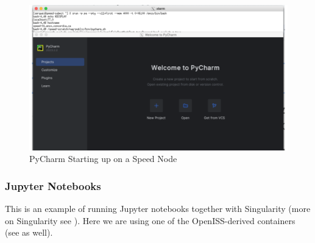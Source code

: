 \begin{figure}[htpb]
	\includegraphics[width=\columnwidth]{images/pycharm}
    \caption{PyCharm Starting up on a Speed Node}
	\label{fig:pycharm}
\end{figure}

\subsubsection{Jupyter Notebooks}
\label{sect:jupyter}

This is an example of running Jupyter notebooks together with Singularity
(more on Singularity see ).
Here we are using one of the OpenISS-derived containers (see  as well).

